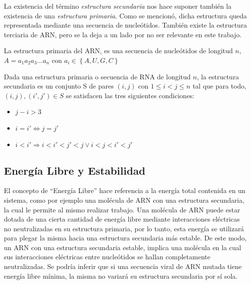   La existencia del t\'ermino \emph{estructura secundaria} nos hace suponer tambi\'en la existencia de una \emph{estructura primaria}. Como se mencion\'o, dicha estructura queda representada mediante una secuencia de nucle\'otidos. Tambi\'en existe la estructura terciaria de ARN, pero se la deja a un lado por no
  ser relevante en este trabajo.

  \begin{definition}
    \label{rna_primary}
    La estructura primaria del ARN, es una secuencia de nucle\'otidos de longitud
    $n$, $A=a_{1}a_{2}a_{3}\dots a_{n}$ con $a_{i} \in \left\lbrace A, U, G, C
    \right\rbrace$ 
  \end{definition}

  \begin{definition}
    \label{rna_secondary}
    Dada una estructura primaria o secuencia de RNA de longitud $n$, la
    estructura secundaria es un conjunto S de pares $(i,j)$ con $1\leq i < j \leq
    n$ tal que para todo, $(i,j), (i',j') \in S$ se satisfacen las tres siguientes
    condiciones:
    \begin{itemize}
      \item $j-i > 3$
      \item $i=i' \Leftrightarrow j=j'$
      \item $i< i'\Rightarrow i < i' < j' < j \lor i < j < i' < j'$ 
    \end{itemize}
  \end{definition}

  \subsection{Energ\'ia Libre y Estabilidad}
  El concepto de ``Energ\'ia Libre'' hace referencia a la energ\'ia total contenida en un sistema, como por ejemplo una mol\'ecula de ARN con una estructura secundaria, la cual le permite al mismo realizar trabajo. Una mol\'ecula de ARN puede estar dotada de una cierta cantidad de energ\'ia libre mediante interacciones el\'ectricas no neutralizadas en su estructura primaria, por lo tanto, esta energ\'ia se utilizar\'a para plegar la misma hacia una estructura secundaria m\'as estable. De este modo, un ARN con una estructura secundaria estable, implica una mol\'ecula en la cual sus interacciones el\'ectricas entre nucle\'otidos se hallan completamente neutralizadas. Se podr\'ia inferir que si una secuencia viral de ARN mutada tiene energ\'ia libre m\'inima, la misma no variar\'a su estructura secundaria por s\'i sola. 
  
